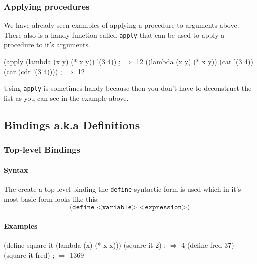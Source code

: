 \documentclass[12pt,a4paper,english,twoside]{article}
\begin{document}
\subsubsection{Applying procedures}
We have already seen examples of applying a procedure to arguments above. There also is a handy function called \texttt{apply} that can be used to apply a procedure to it's arguments.
\begin{schemecode}
(apply (lambda (x y) (* x y)) '(3 4)) ; $\Rightarrow$ 12
((lambda (x y) 
    (* x y)) 
 (car '(3 4)) (car (cdr '(3 4)))) ; $\Rightarrow$ 12
\end{schemecode} 
Using \texttt{apply} is sometimes handy because then you don't have to deconstruct the list as you can see in the example above.
\subsection{Bindings a.k.a Definitions}
\subsubsection{Top-level Bindings}
\paragraph{Syntax}
The create a top-level binding the \texttt{define} syntactic form is used which in it's most basic form looks like this:
\begin{equation*}
\texttt{(define <variable> <expression>)}
\end{equation*}
\paragraph{Examples}
\begin{schemecode}
(define square-it (lambda (x) (* x x)))
(square-it 2) ; $\Rightarrow$ 4
(define fred 37)
(square-it fred) ; $\Rightarrow$ 1369
\end{schemecode}
\end{document}

